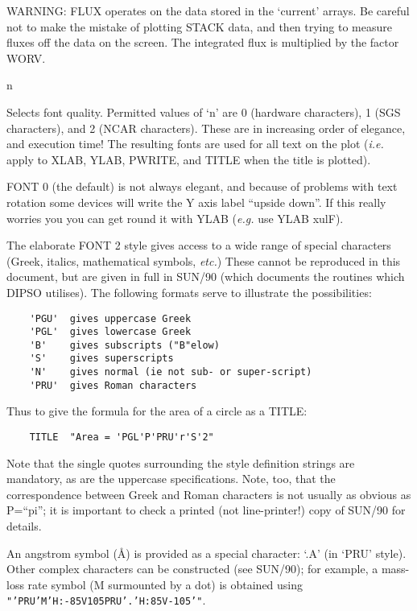 \begin {description}
WARNING: FLUX operates on the data stored in the `current' arrays. Be
careful not to make the mistake of plotting STACK data, and then
trying to measure fluxes off the data on the screen. The integrated
flux is multiplied by the factor WORV.

\item [FONT] n

Selects font quality. Permitted values of `n' are 0 (hardware
characters), 1 (SGS characters), and 2 (NCAR characters). These are in
increasing order of elegance, and execution time! The resulting fonts
are used for all text on the plot ({\em i.e.} apply to XLAB, YLAB,
PWRITE, and TITLE when the title is plotted).

FONT 0 (the default) is not always elegant, and because of problems
with text rotation some devices will write the Y axis label ``upside
down''. If this really worries you you can get round it with YLAB
({\em e.g.} use YLAB xulF).

The elaborate FONT 2 style gives access to a wide range of special
characters (Greek, italics, mathematical symbols, {\em etc.}) These
cannot be reproduced in this document, but are given in full in SUN/90
(which documents the routines which DIPSO utilises). The following
formats serve to illustrate the possibilities:

\begin{verbatim}
    'PGU'  gives uppercase Greek
    'PGL'  gives lowercase Greek
    'B'    gives subscripts ("B"elow)
    'S'    gives superscripts
    'N'    gives normal (ie not sub- or super-script)
    'PRU'  gives Roman characters
\end{verbatim}

Thus to give the formula for the area of a circle as a TITLE:

\begin{verbatim}
    TITLE  "Area = 'PGL'P'PRU'r'S'2"
\end{verbatim}

Note that the single quotes surrounding the style definition strings
are mandatory, as are the uppercase specifications. Note, too, that
the correspondence between Greek and Roman characters is not usually
as obvious as P=``pi'';  it is important to check a printed (not
line-printer!) copy of SUN/90 for details.

An angstrom symbol ({\AA}) is provided as a special character: `.A'
(in `PRU' style).    Other complex characters can be constructed (see
SUN/90);  for example, a mass-loss rate symbol (M surmounted by a dot)
is obtained using {\tt "'PRU'M'H:-85V105PRU'.'H:85V-105'"}.


\end{description}
